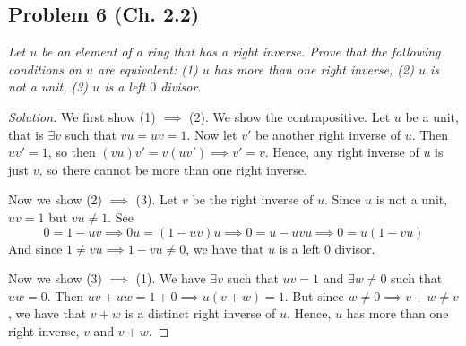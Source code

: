 \documentclass{article}
\begin{document}
\subsection*{Problem 6 (Ch. 2.2)}
{\it Let $u$ be an element of a ring that has a right inverse.
Prove that the following conditions on $u$ are equivalent:
(1) $u$ has more than one right inverse,
(2) $u$ is not a unit,
(3) $u$ is a left $0$ divisor.}
\begin{proof}[Solution]\let\qed\relax
	We first show (1) $\implies$ (2).
	We show the contrapositive.
	Let $u$ be a unit, that is $\exists v$ such that $vu = uv = 1$.
	Now let $v'$ be another right inverse of $u$.
	Then $uv' = 1$, so
	then $(vu)v' = v(uv') \implies v' = v$.
	Hence, any right inverse of $u$ is just $v$,
	so there cannot be more than one right inverse.

	Now we show (2) $\implies$ (3).
	Let $v$ be the right inverse of $u$.
	Since $u$ is not a unit, $uv = 1$ but $vu \neq 1$.
	See
	\[
		0 = 1 - uv \implies 0u = (1 - uv)u \implies
		0 = u - uvu \implies 0 = u(1-vu)
	\]
	And since $1 \neq vu \implies 1 - vu \neq 0$, we have that $u$
	is a left $0$ divisor.

	Now we show (3) $\implies$ (1).
	We have $\exists v$ such that $uv = 1$ and $\exists w\neq0$ such that $uw = 0$.
	Then $uv + uw = 1 + 0 \implies u(v + w) = 1$.
	But since $w \neq 0 \implies v + w \neq v$,
	we have that $v + w$ is a distinct right inverse of $u$.
	Hence, $u$ has more than one right inverse, $v$ and $v + w$.
\end{proof}
\end{document}
